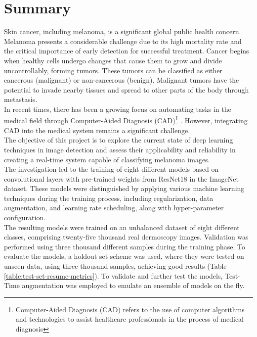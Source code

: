 \chapter*{Summary}

Skin cancer, including melanoma, is a significant global public health concern.
Melanoma presents a considerable challenge due to its high mortality rate and
the critical importance of early detection for successful treatment. Cancer
begins when healthy cells undergo changes that cause them to grow and divide
uncontrollably, forming tumors. These tumors can be classified as either
cancerous (malignant) or non-cancerous (benign). Malignant tumors have the
potential to invade nearby tissues and spread to other parts of the body
through metastasis. \\

In recent times, there has been a growing focus on automating tasks in the
medical field through Computer-Aided Diagnosis (CAD)\footnote{Computer-Aided
Diagnosis (CAD) refers to the use of computer algorithms and technologies to
assist healthcare professionals in the process of medical diagnosis} . However,
integrating CAD into the medical system remains a significant challenge. \\

The objective of this project is to explore the current state of deep learning
techniques in image detection and assess their applicability and reliability in
creating a real-time system capable of classifying melanoma images. \\

The investigation led to the training of eight different models based on
convolutional layers with pre-trained weights from ResNet18 in the ImageNet
dataset. These models were distinguished by applying various machine learning
techniques during the training process, including regularization, data
augmentation, and learning rate scheduling, along with hyper-parameter
configuration. \\

The resulting models were trained on an unbalanced dataset of eight different
classes, comprising twenty-five thousand real dermoscopy images. Validation was
performed using three thousand different samples during the training phase. To
evaluate the models, a holdout set scheme was used, where they were tested on
unseen data, using three thousand samples, achieving good results (Table
\ref{table:test-set-resume-metrics}). To validate and further test the models,
Test-Time augmentation was employed to emulate an ensemble of models on the
fly. \\

